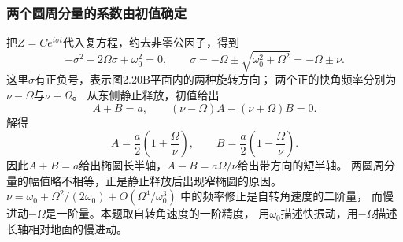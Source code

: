 \documentclass[UTF8,fontset=fandol,a4paper,11pt]{ctexart}
\begin{document}
\subsubsection*{两个圆周分量的系数由初值确定}
把$Z=C e^{i\sigma t}$代入复方程，约去非零公因子，得到
\[
-\sigma^2-2\Omega\sigma+\omega_0^2=0,
\qquad \sigma=-\Omega\pm\sqrt{\omega_0^2+\Omega^2}
=-\Omega\pm\nu.
\]
这里$\sigma$有正负号，表示图2.20B平面内的两种旋转方向；
两个正的快角频率分别为$\nu-\Omega$与$\nu+\Omega$。
从东侧静止释放，初值给出
\[
A+B=a,\qquad (\nu-\Omega)A-(\nu+\Omega)B=0.
\]
解得
\[
A=\frac a2\left(1+\frac\Omega\nu\right),\qquad
B=\frac a2\left(1-\frac\Omega\nu\right).
\]
因此$A+B=a$给出椭圆长半轴，$A-B=a\Omega/\nu$给出带方向的短半轴。
两圆周分量的幅值略不相等，正是静止释放后出现窄椭圆的原因。
$\nu=\omega_0+\Omega^2/(2\omega_0)+O(\Omega^4/\omega_0^3)$
中的频率修正是自转角速度的二阶量，
而慢进动$-\Omega$是一阶量。本题取自转角速度的一阶精度，
用$\omega_0$描述快振动，用$-\Omega$描述长轴相对地面的慢进动。
\end{document}
